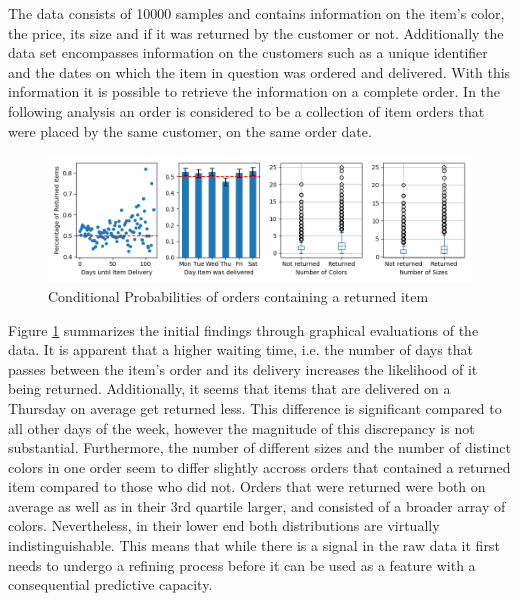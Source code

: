 The data consists of 10000 samples and contains information on the item's color, the price, its size and if it was returned by the customer or not. Additionally the data set encompasses information on the customers such as a unique identifier and the dates on which the item in question was ordered and delivered. With this information it is possible to retrieve the information on a complete order. In the following analysis an order is considered to be a collection of item orders that were placed by the same customer, on the same order date.

\begin{figure}
\centering
\caption{Conditional Probabilities of orders containing a returned item}
\label{exploratory}
\includegraphics[scale=0.45]{../eda/exploratory.png}
\end{figure}

Figure \ref{exploratory} summarizes the initial findings through graphical evaluations of the data. It is apparent that a higher waiting time, i.e. the number of days that passes between the item's order and its delivery increases the likelihood of it being returned. Additionally, it seems that items that are delivered on a Thursday on average get returned less. This difference is significant compared to all other days of the week, however the magnitude of this discrepancy is not substantial. Furthermore, the number of different sizes and the number of distinct colors in one order seem to differ slightly accross orders that contained a returned item compared to those who did not. Orders that were returned were both on average as well as in their 3rd quartile larger, and consisted of a broader array of colors. Nevertheless, in their lower end both distributions are virtually indistinguishable. This means that while there is a signal in the raw data it first needs to undergo a refining process before it can be used as a feature with a consequential predictive capacity. 